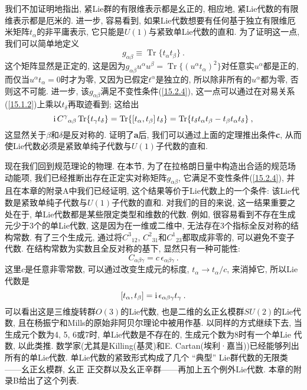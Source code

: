 我们不加证明地指出, 紧Lie群的有限维表示都是幺正的, 相应地, 紧Lie代数的有限维表示都是厄米的. 进一步, 容易看到, 
如果Lie代数想要有任何基于独立有限维厄米矩阵$t_{\alpha }$的非平庸表示, 它只能是$U(1)$与紧致单Lie代数的直和. 为了证明这一点, 
我们可以简单地定义
\[
g_{\alpha \beta }\equiv \operatorname{Tr}\{t_{\alpha }t_{\beta }\}\:. 
\]%
这个矩阵显然是正定的, 这是因为$g_{\alpha \beta }u^{\alpha}u^{\beta }=\operatorname{Tr}\{(u^{\alpha }t_{\alpha })^{2}\}$对任意实$u^{\alpha }$都是正的, 而仅当$u^{\alpha }t_{\alpha }=0$时才为零, 又因为已假定$t^{\alpha}$是独立的, 所以除非所有的$u^{\alpha }$都为零, 否则这不可能. 进一步, 该$g_{\alpha \beta }$满足不变性条件(\ref{15.2.4}), 
这一点可以通过在对易关系(\ref{15.1.2})上乘以$t_{\delta }$再取迹看到; 这给出
\[
\mi\,C^{\gamma }{}_{\alpha \beta }\operatorname{Tr}\{t_{\gamma }t_{\delta }\}=%
\operatorname{Tr}\{[t_{\alpha },t_{\beta }]\,t_{\delta }\}=\operatorname{Tr}%
\{t_{\delta }t_{\alpha }t_{\beta }-t_{\beta }t_{\alpha }t_{\delta }\} \:,
\]%
这显然关于$\beta $和$\delta $是反对称的. 证明了{\bf{a}}后, 我们可以通过上面的定理推出条件{\bf{c}}, 
从而使Lie代数必须是紧致单纯子代数与$U(1)$子代数的直和.

现在我们回到规范理论的物理. 在本节, 为了在拉格朗日量中构造出合适的规范场动能项, 我们已经推断出存在正定实对称矩阵$g_{\alpha \beta }$,
它满足不变性条件(\ref{15.2.4}), 并且在本章的附录A中我们已经证明, 这个结果等价于Lie代数上的一个条件: 该Lie代数是紧致单纯子代数与$U(1)$子代数的直和. 对我们的目的来说, 这一结果重要之处在于, 单Lie代数都是某些限定类型和维数的代数. 例如, 很容易看到不存在生成元少于3个的单Lie代数, 
这是因为在一维或二维中, 无法存在3个指标全反对称的结构常数. 有了三个生成元, 通过将$%
C^{3}{}_{12}$, $C^{2}{}_{31}$和$C^{1}{}_{23}$都取成非零的,
可以避免不变子代数. 在结构常数为实数且全反对称的基下, 显然只有一种可能性:%
\[
C_{\alpha \beta \gamma }=c\,\epsilon _{\alpha \beta \gamma }\:. 
\]%
这里$c$是任意非零常数, 可以通过改变生成元的标度, $t_{\alpha }\rightarrow t_{\alpha }/c$,
来消掉它, 所以Lie代数是
\[
[t_{\alpha },t_{\beta }]=\mathrm{i}\,\epsilon _{\alpha \beta \gamma }t_{\gamma } \:. 
\]%
可以看出这是三维旋转群$O(3)$的Lie代数, 也是二维的幺正幺模群$SU(2)$的Lie代数, 且在杨振宁和Mills的原始非阿贝尔理论中被用作基. 
以同样的方式继续下去, 当生成元个数为4, 5, 6或7时, 单Lie代数是不存在的, 生成元个数为8时有一个单Lie%
代数, 以此类推. 数学家(尤其是Killing(基灵)和E. Cartan(埃利·嘉当))已经能够列出所有的单Lie代数.
单Lie代数的紧致形式构成了几个 ``典型'' Lie群代数的无限类——幺正幺模群, 幺正%
正交群以及幺正辛群——再加上五个例外Lie代数. 本章的附录B给出了这个列表.

